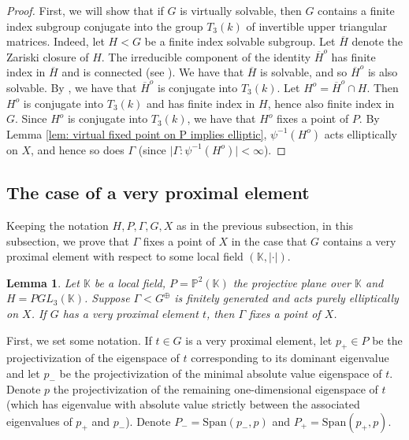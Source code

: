 \documentclass[12pt]{article}
\newtheorem{lem}[thm]{Lemma}
\theoremstyle{definition}
\newcommand{\K}{\mathbb{K}}
\newcommand{\Span}{\mathrm{Span}}
\begin{document}
\begin{proof}
    First, we will show that if $G$ is virtually solvable, then $G$ contains a finite index subgroup conjugate into the group $T_3(k)$ of invertible upper triangular matrices. Indeed, let $H < G$ be a finite index solvable subgroup. Let $\overline{H}$ denote the Zariski closure of $H$. The irreducible component of the identity $\overline{H}^o$ has finite index in $\overline{H}$ and is connected (see \cite[Proposition 5.92]{KapDrutu}). We have that $\overline{H}$ is solvable, and so $\overline{H}^o$ is also solvable. By \cite[Theorem 14.65]{KapDrutu}, we have that $\overline{H}^o$ is conjugate into $T_3(k)$. Let $H^o = \overline{H}^o \cap H$. Then $H^o$ is conjugate into $T_3(k)$ and has finite index in $H$, hence also finite index in $G$. Since $H^o$ is conjugate into $T_3(k)$, we have that $H^o$ fixes a point of $P$. By Lemma \ref{lem: virtual fixed point on P implies elliptic}, $\psi^{-1}(H^o)$ acts elliptically on $X$, and hence so does $\Gamma$ (since $\vert \Gamma : \psi^{-1}(H^o) \vert < \infty$).
    
\end{proof}



\subsection{The case of a very proximal element}
\label{sec: NSD element}

Keeping the notation $H,P,\Gamma, G, X$ as in the previous subsection, in this subsection, we prove that $\Gamma$ fixes a point of $X$ in the case that $G$ contains a very proximal element with respect to some local field $(\mathbb{K}, \vert \cdot \vert)$.

\begin{lem}
    \label{lem: very proximal}
    Let $\K$ be a local field, $P = \mathbb{P}^2(\K)$ the projective plane over $\K$ and $H = PGL_3(\K)$. Suppose $\Gamma < G^{\oplus}$ is finitely generated and acts purely elliptically on $X$. If $G$ has a very proximal element $t$, then $\Gamma$ fixes a point of $X$. 
\end{lem}

First, we set some notation. If $t \in G$ is a very proximal element, let $p_+ \in P$ be the projectivization of the eigenspace of $t$ corresponding to its dominant eigenvalue and let $p_-$ be the projectivization of the minimal absolute value eigenspace of $t$. Denote $p$ the projectivization of the remaining one-dimensional eigenspace of $t$ (which has eigenvalue with absolute value strictly between the associated eigenvalues of $p_+$ and $p_-$). Denote $P_- = \Span(p_-, p)$ and $P_+ = \Span(p_+, p)$. 
\end{document}

